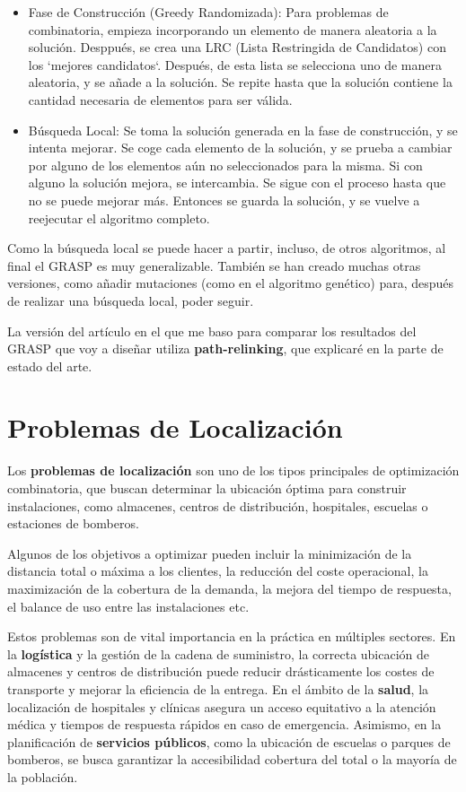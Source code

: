 \documentclass[12pt,a4paper]{book}
\begin{document}
\begin{itemize}
    \item Fase de Construcción (Greedy Randomizada):
    Para problemas de combinatoria, empieza incorporando un elemento de manera aleatoria a la solución. Desppués, se crea una LRC (Lista Restringida de Candidatos) con los `mejores candidatos`. Después,
de esta lista se selecciona uno de manera aleatoria, y se añade a la solución. Se repite hasta que la solución contiene la cantidad necesaria de elementos para ser válida.
    \item Búsqueda Local:
    Se toma la solución generada en la fase de construcción, y se intenta mejorar. Se coge cada elemento de la solución, y se prueba a cambiar por alguno de los elementos aún no seleccionados para la misma. Si con alguno la solución mejora, se intercambia.
    Se sigue con el proceso hasta que no se puede mejorar más. Entonces se guarda la solución, y se vuelve a reejecutar el algoritmo completo.
\end{itemize}

Como la búsqueda local se puede hacer a partir, incluso, de otros algoritmos, al final el GRASP
es muy generalizable. También se han creado muchas otras versiones, como añadir mutaciones (como en el algoritmo genético) para, después de realizar
una búsqueda local, poder seguir.

La versión del artículo en el que me baso para comparar los resultados del GRASP que voy a diseñar utiliza \textbf{path-relinking}, que explicaré en la parte de estado del arte.




\section{Problemas de Localización}

Los \textbf{problemas de localización} son uno de los tipos principales de optimización combinatoria, que buscan determinar la ubicación óptima para construir instalaciones, como almacenes, centros de distribución, hospitales, escuelas o estaciones de bomberos. 

Algunos de los objetivos a optimizar pueden incluir la minimización de la distancia total o máxima a los clientes, la reducción del coste operacional, la maximización de la cobertura de la demanda, la mejora del tiempo de respuesta, el balance de uso entre las instalaciones etc.

Estos problemas son de vital importancia en la práctica en múltiples sectores. En la \textbf{logística} y la gestión de la cadena de suministro, la correcta ubicación de almacenes y centros de distribución puede reducir drásticamente los costes de transporte y mejorar la eficiencia de la entrega. En el ámbito de la \textbf{salud}, la localización de hospitales y clínicas asegura un acceso equitativo a la atención médica y tiempos de respuesta rápidos en caso de emergencia. Asimismo, en la planificación de \textbf{servicios públicos}, como la ubicación de escuelas o parques de bomberos, se busca garantizar la accesibilidad cobertura del total o la mayoría de la población.
\end{document}
